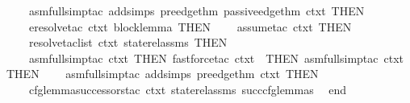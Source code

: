 \begin{isabellebody}
\ \ \ \ {\isacharparenleft}{\kern0pt}asm{\isacharunderscore}{\kern0pt}full{\isacharunderscore}{\kern0pt}simp{\isacharunderscore}{\kern0pt}tac\ {\isacharparenleft}{\kern0pt}add{\isacharunderscore}{\kern0pt}simps\ {\isacharbrackleft}{\kern0pt}pre{\isacharunderscore}{\kern0pt}edge{\isacharunderscore}{\kern0pt}thm{\isacharcomma}{\kern0pt}\ passive{\isacharunderscore}{\kern0pt}edge{\isacharunderscore}{\kern0pt}thm{\isacharbrackright}{\kern0pt}\ ctxt{\isacharparenright}{\kern0pt}{\isacharparenright}{\kern0pt}\ THEN{\isacharprime}{\kern0pt}\isanewline
\ \ \ \ eresolve{\isacharunderscore}{\kern0pt}tac\ ctxt\ {\isacharbrackleft}{\kern0pt}block{\isacharunderscore}{\kern0pt}lemma{\isacharbrackright}{\kern0pt}\ THEN{\isacharprime}{\kern0pt}\isanewline
\ \ \ \ assume{\isacharunderscore}{\kern0pt}tac\ ctxt\ THEN{\isacharprime}{\kern0pt}\isanewline
\ \ \ \ resolve{\isacharunderscore}{\kern0pt}tac{\isacharunderscore}{\kern0pt}list\ ctxt\ state{\isacharunderscore}{\kern0pt}rel{\isacharunderscore}{\kern0pt}assms\ THEN{\isacharprime}{\kern0pt}\isanewline
\ \ \ \ asm{\isacharunderscore}{\kern0pt}full{\isacharunderscore}{\kern0pt}simp{\isacharunderscore}{\kern0pt}tac\ ctxt\ THEN{\isacharprime}{\kern0pt}\ fastforce{\isacharunderscore}{\kern0pt}tac\ ctxt\ {\isacharbrackleft}{\kern0pt}{\isacharbrackright}{\kern0pt}\ THEN{\isacharprime}{\kern0pt}\ asm{\isacharunderscore}{\kern0pt}full{\isacharunderscore}{\kern0pt}simp{\isacharunderscore}{\kern0pt}tac\ ctxt\ THEN{\isacharprime}{\kern0pt}\isanewline
\ \ \ \ {\isacharparenleft}{\kern0pt}asm{\isacharunderscore}{\kern0pt}full{\isacharunderscore}{\kern0pt}simp{\isacharunderscore}{\kern0pt}tac\ {\isacharparenleft}{\kern0pt}add{\isacharunderscore}{\kern0pt}simps\ {\isacharbrackleft}{\kern0pt}pre{\isacharunderscore}{\kern0pt}edge{\isacharunderscore}{\kern0pt}thm{\isacharbrackright}{\kern0pt}\ ctxt{\isacharparenright}{\kern0pt}{\isacharparenright}{\kern0pt}\ THEN{\isacharprime}{\kern0pt}\isanewline
\ \ \ \ cfg{\isacharunderscore}{\kern0pt}lemma{\isacharunderscore}{\kern0pt}successors{\isacharunderscore}{\kern0pt}tac\ ctxt\ state{\isacharunderscore}{\kern0pt}rel{\isacharunderscore}{\kern0pt}assms\ succ{\isacharunderscore}{\kern0pt}cfg{\isacharunderscore}{\kern0pt}lemmas\isanewline
\ \ end\isanewline
{\isacartoucheclose}%
\endisatagML
{\isafoldML}%
%
\isadelimML
\isanewline
%
\endisadelimML
%
\isadelimtheory
\isanewline
%
\endisadelimtheory
%
\isatagtheory
{}\isamarkupfalse%
%
\endisatagtheory
{\isafoldtheory}%
%
\isadelimtheory
%
\endisadelimtheory
%
\end{isabellebody}%
\endinput
